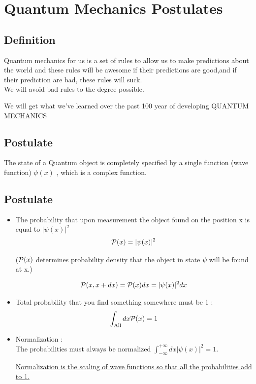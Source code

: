 \documentclass[12pt,oneside]{book}
\begin{document}



\chapter{Quantum Mechanics Postulates}
\section{Definition}
Quantum mechanics for us is a set of rules to allow us to make predictions about the world and these rules will be awesome if their predictions are good,and if their prediction are bad, these rules will suck.\\
We will avoid bad rules to the degree possible.
\begin{center}
	We will get what we've learned over the past 100 year of developing QUANTUM MECHANICS
\end{center}
\section{Postulate }
The state of a Quantum object is completely specified by a single function (wave function) $\psi(x)$ , which is a complex function.
\section{Postulate }
\begin{itemize}
	\item The probability that upon measurement the object found on the position x is equal to $|\psi(x)|^2$ \\
	      \[\mathcal{P}(x) = |\psi(x)|^2\]
	      \begin{center}
		      ($\mathcal{P}(x) $ determines probability density that the object in state $\psi$ will be found at x.)
	      \end{center}
	      \[ \mathcal{P}(x,x+dx) = \mathcal{P}(x)dx = |\psi(x)|^2dx \]
	\item Total probability that you find something somewhere must be 1 :
	      \[ \int_\text{All} dx \mathcal{P}(x) = 1 \]
	\item Normalization :\\
	      The probabilities must always be normalized $ \int^{+\infty}_{-\infty} dx |\psi(x)|^2 = 1$.
	      \begin{center}
		      \underline{Normalization is the scaling of wave functions so that all the probabilities add to 1.}
	      \end{center}
\end{itemize}
\end{document}
